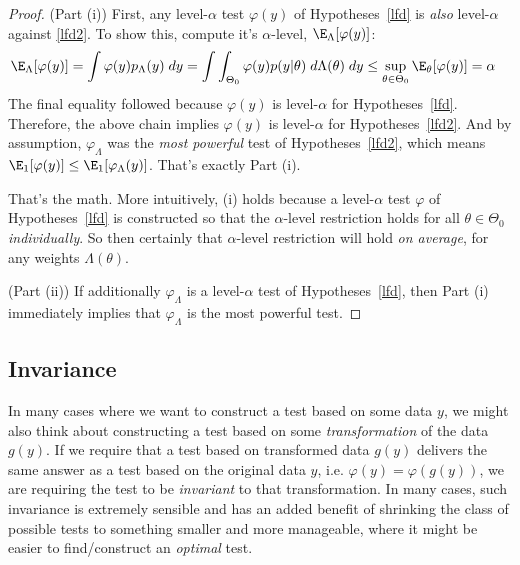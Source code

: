 \documentclass[12pt]{article}
\theoremstyle{plain}
\theoremstyle{definition}
\theoremstyle{remark}
\begin{document}
\begin{proof}
(Part (i))
First, any level-$\alpha$ test $\varphi(y)$ of
Hypotheses~\ref{lfd} is \emph{also} level-$\alpha$ against \ref{lfd2}.
To show this, compute it's $\alpha$-level, $\E_\Lambda[\varphi(y)]$:
\begin{align*}
  \E_\Lambda[\varphi(y)]
  =
  \int \varphi(y)p_\Lambda(y)\;dy
  &=
  \int \int_{\Theta_0} \varphi(y)p(y|\theta) \;d\Lambda(\theta)\;dy
  \leq
  \sup_{\theta\in\Theta_0}
  \E_\theta[\varphi(y)]
  =
  \alpha
\end{align*}
The final equality followed because $\varphi(y)$ is level-$\alpha$ for
Hypotheses~\ref{lfd}.
Therefore, the above chain implies $\varphi(y)$ is level-$\alpha$
for Hypotheses~\ref{lfd2}. And by assumption, $\varphi_\Lambda$
was the \emph{most powerful} test of Hypotheses~\ref{lfd2}, which means
$\E_1[\varphi(y)]\leq\E_1[\varphi_\Lambda(y)]$. That's exactly
Part (i).

That's the math.
More intuitively, (i) holds because a level-$\alpha$ test
$\varphi$ of Hypotheses~\ref{lfd} is constructed so that the
$\alpha$-level restriction holds for all $\theta\in\Theta_0$
\emph{individually}.  So then certainly that $\alpha$-level
restriction will hold \emph{on average}, for any weights
$\Lambda(\theta)$.

(Part (ii))
If additionally $\varphi_\Lambda$ is a level-$\alpha$ test of
Hypotheses~\ref{lfd}, then Part (i) immediately implies that
$\varphi_\Lambda$ is the most powerful test.
\end{proof}


\clearpage
\subsection{Invariance}

In many cases where we want to construct a test based on some data $y$,
we might also think about constructing a test based on some
\emph{transformation} of the data $g(y)$. If we require that a test
based on transformed data $g(y)$ delivers the same answer as a test
based on the original data $y$, i.e. $\varphi(y)=\varphi(g(y))$, we are
requiring the test to be \emph{invariant} to that transformation.
In many cases, such invariance is extremely sensible and has an added
benefit of shrinking the class of possible tests to something smaller
and more manageable, where it might be easier to find/construct an
\emph{optimal} test.
\end{document}
